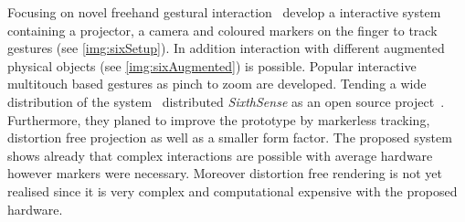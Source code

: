 Focusing on novel freehand gestural interaction~\textcite{Pranavv:2009bo} develop a interactive system containing a projector, a camera and coloured markers on the finger to track gestures (see \autoref{img:sixSetup}). In addition interaction with different augmented physical objects (see \autoref{img:sixAugmented}) is possible. Popular interactive multitouch based gestures as pinch to zoom are developed. Tending a wide distribution of the system~\citeauthor{Pranavv:2009bo} distributed \textit{SixthSense} as an open source project~\cite{Pranavv:2013ng}. Furthermore, they planed to improve the prototype by markerless tracking, distortion free projection as well as a smaller form factor. The proposed system shows already that complex interactions are possible with average hardware however markers were necessary. Moreover distortion free rendering is not yet realised since it is very complex and computational expensive with the proposed hardware. 

